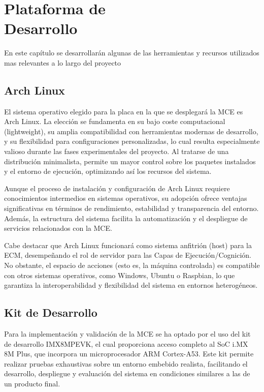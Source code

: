 \chapter[Plataforma de Desarrollo]{Plataforma de \\ Desarrollo}

En este capítulo se desarrollarán algunas de las herramientas y recursos
utilizados mas relevantes a lo largo del proyecto

\section{Arch Linux}
El sistema operativo elegido para la placa en la que se desplegará la MCE es 
Arch Linux. La elección se fundamenta en su bajo coste computacional (lightweight), su
amplia compatibilidad con herramientas modernas de desarrollo, y su flexibilidad
para configuraciones personalizadas, lo cual resulta especialmente valioso
durante las fases experimentales del proyecto. Al tratarse de una distribución
minimalista, permite un mayor control sobre los paquetes instalados y el entorno
de ejecución, optimizando así los recursos del sistema.

Aunque el proceso de instalación y configuración de Arch Linux requiere
conocimientos intermedios en sistemas operativos, su adopción ofrece ventajas
significativas en términos de rendimiento, estabilidad y transparencia del
entorno. Además, la estructura del sistema facilita la automatización y el
despliegue de servicios relacionados con la MCE.

Cabe destacar que Arch Linux funcionará como sistema anfitrión (host) para la
ECM, desempeñando el rol de servidor para las Capas de Ejecución/Cognición. No obstante, 
el espacio de acciones (esto es, la máquina controlada) es compatible con otros 
sistemas operativos, como Windows, Ubuntu o Raspbian, lo que garantiza la 
interoperabilidad y flexibilidad del sistema en entornos heterogéneos.


\section{Kit de Desarrollo}
Para la implementación y validación de la MCE se ha optado por el uso del kit de
desarrollo IMX8MPEVK, el cual proporciona acceso completo al SoC i.MX 8M Plus,
que incorpora un microprocesador ARM Cortex-A53. Este kit permite realizar
pruebas exhaustivas sobre un entorno embebido realista, facilitando el
desarrollo, despliegue y evaluación del sistema en condiciones similares a las
de un producto final.

